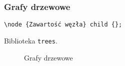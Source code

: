 \documentclass[10pt,t]{beamer}
\begin{document}
\begin{frame}
  \frametitle{Grafy drzewowe}


  \texttt{\textbackslash node \{Zawartość węzła\} child \{<kod węzła>\};}

  Biblioteka \texttt{trees}.





  \begin{figure}

    \centering


    \begin{tikzpicture}


    \end{tikzpicture}






    \caption{Grafy drzewowe}

  \end{figure}

\end{frame}
\end{document}
